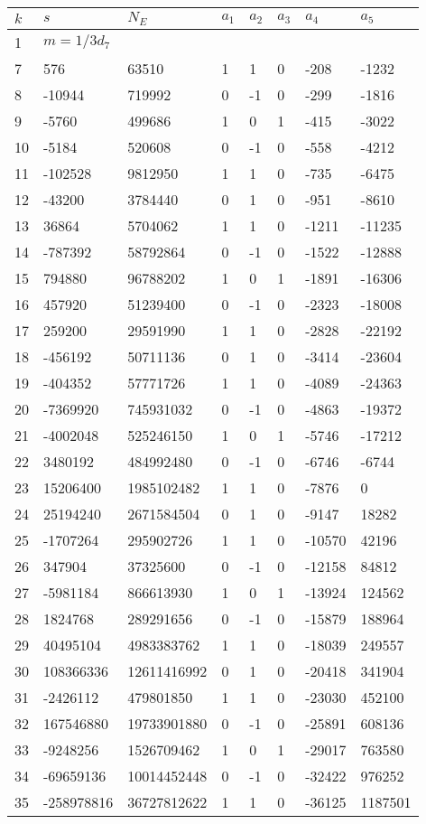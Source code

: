 \documentclass{amsart}
\begin{document}
\begin{longtable}{|l|l|l|lllll|}
\hline
$k$ & $s$ & $N_E$ & $a_1$ & $a_2$ & $a_3$ & $a_4$ & $a_5$\\
\hline
1&$m=1/3d_{7}$&&\multicolumn{5}{c|}{}\\
7&576&63510&1&1&0&-208&-1232\\
8&-10944&719992&0&-1&0&-299&-1816\\
9&-5760&499686&1&0&1&-415&-3022\\
10&-5184&520608&0&-1&0&-558&-4212\\
11&-102528&9812950&1&1&0&-735&-6475\\
12&-43200&3784440&0&1&0&-951&-8610\\
13&36864&5704062&1&1&0&-1211&-11235\\
14&-787392&58792864&0&-1&0&-1522&-12888\\
15&794880&96788202&1&0&1&-1891&-16306\\
16&457920&51239400&0&-1&0&-2323&-18008\\
17&259200&29591990&1&1&0&-2828&-22192\\
18&-456192&50711136&0&1&0&-3414&-23604\\
19&-404352&57771726&1&1&0&-4089&-24363\\
20&-7369920&745931032&0&-1&0&-4863&-19372\\
21&-4002048&525246150&1&0&1&-5746&-17212\\
22&3480192&484992480&0&-1&0&-6746&-6744\\
23&15206400&1985102482&1&1&0&-7876&0\\
24&25194240&2671584504&0&1&0&-9147&18282\\
25&-1707264&295902726&1&1&0&-10570&42196\\
26&347904&37325600&0&-1&0&-12158&84812\\
27&-5981184&866613930&1&0&1&-13924&124562\\
28&1824768&289291656&0&-1&0&-15879&188964\\
29&40495104&4983383762&1&1&0&-18039&249557\\
30&108366336&12611416992&0&1&0&-20418&341904\\
31&-2426112&479801850&1&1&0&-23030&452100\\
32&167546880&19733901880&0&-1&0&-25891&608136\\
33&-9248256&1526709462&1&0&1&-29017&763580\\
34&-69659136&10014452448&0&-1&0&-32422&976252\\
35&-258978816&36727812622&1&1&0&-36125&1187501\\

\end{longtable}
\end{document}
